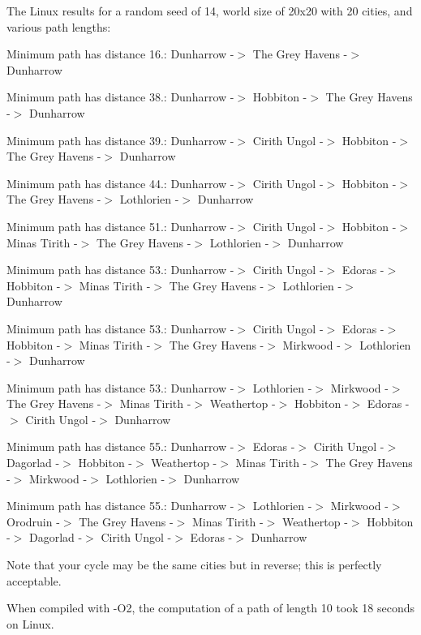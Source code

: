 The Linux results for a random seed of 14, world size of 20x20 with 20 cities, and various path lengths\+:


\begin{DoxyEnumerate}
\item Minimum path has distance 16.\+: Dunharrow -\/$>$ The Grey Havens -\/$>$ Dunharrow
\item Minimum path has distance 38.\+: Dunharrow -\/$>$ Hobbiton -\/$>$ The Grey Havens -\/$>$ Dunharrow
\item Minimum path has distance 39.\+: Dunharrow -\/$>$ Cirith Ungol -\/$>$ Hobbiton -\/$>$ The Grey Havens -\/$>$ Dunharrow
\item Minimum path has distance 44.\+: Dunharrow -\/$>$ Cirith Ungol -\/$>$ Hobbiton -\/$>$ The Grey Havens -\/$>$ Lothlorien -\/$>$ Dunharrow
\item Minimum path has distance 51.\+: Dunharrow -\/$>$ Cirith Ungol -\/$>$ Hobbiton -\/$>$ Minas Tirith -\/$>$ The Grey Havens -\/$>$ Lothlorien -\/$>$ Dunharrow
\item Minimum path has distance 53.\+: Dunharrow -\/$>$ Cirith Ungol -\/$>$ Edoras -\/$>$ Hobbiton -\/$>$ Minas Tirith -\/$>$ The Grey Havens -\/$>$ Lothlorien -\/$>$ Dunharrow
\item Minimum path has distance 53.\+: Dunharrow -\/$>$ Cirith Ungol -\/$>$ Edoras -\/$>$ Hobbiton -\/$>$ Minas Tirith -\/$>$ The Grey Havens -\/$>$ Mirkwood -\/$>$ Lothlorien -\/$>$ Dunharrow
\item Minimum path has distance 53.\+: Dunharrow -\/$>$ Lothlorien -\/$>$ Mirkwood -\/$>$ The Grey Havens -\/$>$ Minas Tirith -\/$>$ Weathertop -\/$>$ Hobbiton -\/$>$ Edoras -\/$>$ Cirith Ungol -\/$>$ Dunharrow
\item Minimum path has distance 55.\+: Dunharrow -\/$>$ Edoras -\/$>$ Cirith Ungol -\/$>$ Dagorlad -\/$>$ Hobbiton -\/$>$ Weathertop -\/$>$ Minas Tirith -\/$>$ The Grey Havens -\/$>$ Mirkwood -\/$>$ Lothlorien -\/$>$ Dunharrow
\item Minimum path has distance 55.\+: Dunharrow -\/$>$ Lothlorien -\/$>$ Mirkwood -\/$>$ Orodruin -\/$>$ The Grey Havens -\/$>$ Minas Tirith -\/$>$ Weathertop -\/$>$ Hobbiton -\/$>$ Dagorlad -\/$>$ Cirith Ungol -\/$>$ Edoras -\/$>$ Dunharrow
\end{DoxyEnumerate}

Note that your cycle may be the same cities but in reverse; this is perfectly acceptable.

When compiled with {\ttfamily -\/\+O2}, the computation of a path of length 10 took 18 seconds on Linux.


